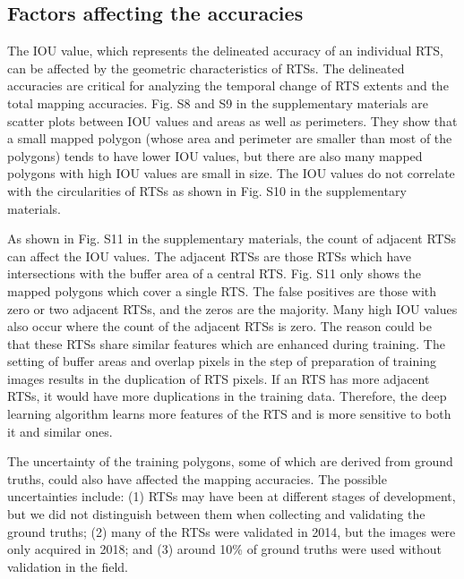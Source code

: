 \documentclass[authoryear,preprint,review,12pt]{elsarticle}
\begin{document}
\subsection{Factors affecting the accuracies}
\label{subsec_acc_factors}

The IOU value, which represents the delineated accuracy of an individual RTS, can be affected by the geometric characteristics of RTSs.
The delineated accuracies are critical for analyzing the temporal change of RTS extents and the total mapping accuracies.
Fig. S8 and S9 in the supplementary materials are scatter plots between IOU values and areas as well as perimeters. They show that a small mapped polygon (whose area and perimeter are smaller than most of the polygons) tends to have lower IOU values, but there are also many mapped polygons with high IOU values are small in size. 
The IOU values do not correlate with the circularities of RTSs as shown in Fig. S10 in the supplementary materials. 


As shown in Fig. S11 in the supplementary materials, the count of adjacent RTSs can affect the IOU values. The adjacent RTSs are those RTSs which have intersections with the buffer area of a central RTS. Fig. S11 only shows the mapped polygons which cover a single RTS. The false positives are those with zero or two adjacent RTSs, and the zeros are the majority. Many high IOU values also occur where the count of the adjacent RTSs is zero. The reason could be that these RTSs share similar features which are enhanced during training. The setting of buffer areas and overlap pixels in the step of preparation of training images results in the duplication of RTS pixels. If an RTS has more adjacent RTSs, it would have more duplications in the training data. Therefore, the deep learning algorithm learns more features of the RTS and is more sensitive to both it and similar ones. 

The uncertainty of the training polygons, some of which are derived from ground truths, could also have affected the mapping accuracies. The possible uncertainties include: (1) RTSs may have been at different stages of development, but we did not distinguish between them when collecting and validating the ground truths; (2) many of the RTSs were validated in 2014, but the images were only acquired in 2018; and (3) around 10\% of ground truths were used without validation in the field. 
\end{document}
